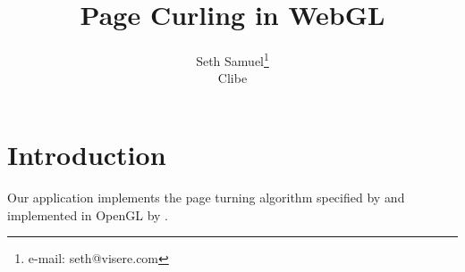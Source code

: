 \documentclass{acmsiggraph}                     %
\title{Page Curling in WebGL}
\author{Seth Samuel\thanks{e-mail: seth@visere.com}\\ Clibe}
\begin{document}


\maketitle


\begin{abstract}

\end{abstract}




\section{Introduction}


 \copyrightspace

Our application implements the page turning algorithm specified by \cite{Lichan-Hong:2004fk} and implemented in OpenGL by \cite{Nuon:uq}.
\end{document}
